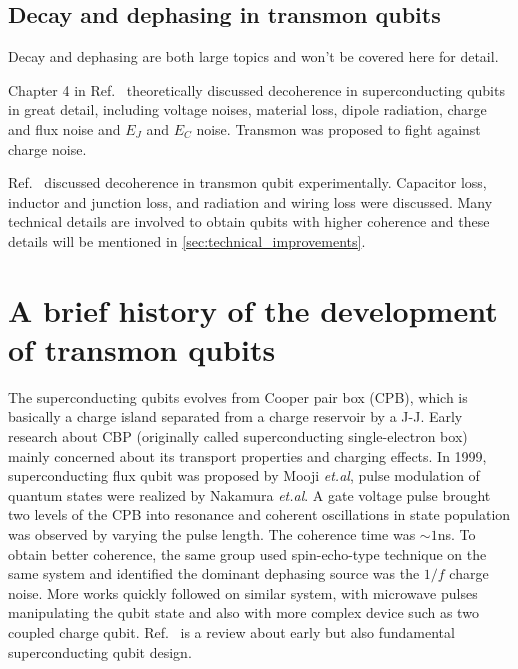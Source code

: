 \documentclass[%
groupedaddress,
showpacs,
 amsmath,amssymb,
 aps,
prb,
]{revtex4-1}
\newcommand{\etal}{\textit{et.al}}
\begin{document}
        

    \subsection{Decay and dephasing in transmon qubits} %
    \label{sub:decay_and_dephasing_in_transmon_qubits}

    Decay and dephasing are both large topics and won't be covered here for detail.

    Chapter 4 in Ref.~ theoretically discussed decoherence in superconducting qubits in great detail, including voltage noises, material loss, dipole radiation, charge and flux noise and $E_J$ and $E_C$ noise. Transmon was proposed to fight against charge noise.

    Ref.~ discussed decoherence in transmon qubit experimentally. Capacitor loss, inductor and junction loss, and radiation and wiring loss were discussed. Many technical details are involved to obtain qubits with higher coherence and these details will be mentioned in \ref{sec:technical_improvements}.
    
    



\section{A brief history of the development of transmon qubits} %
\label{sec:history_of_the_development_of_transmon_qubit}

The superconducting qubits evolves from Cooper pair box (CPB), which is basically a charge island separated from a charge reservoir by a J-J. Early research about CBP (originally called superconducting single-electron box\cite{Nakamura1997}) mainly concerned about its transport properties and charging effects. In 1999, superconducting flux qubit was proposed by Mooji \etal{}\cite{Mooij1999}, pulse modulation of quantum states were realized by Nakamura \etal\cite{Nakamura1999}. A gate voltage pulse brought two levels of the CPB into resonance and coherent oscillations in state population was observed by varying the pulse length. The coherence time was $\sim 1$ns. To obtain better coherence, the same group used spin-echo-type technique on the same system and identified the dominant dephasing source was the $1/f$ charge noise\cite{Nakamura2002}. More works quickly followed on similar system, with microwave pulses manipulating the qubit state\cite{Vion2002,Collin2004} and also with more complex device such as two coupled charge qubit\cite{Pashkin2003}. Ref.~ is a review about early but also fundamental superconducting qubit design.
\end{document}
